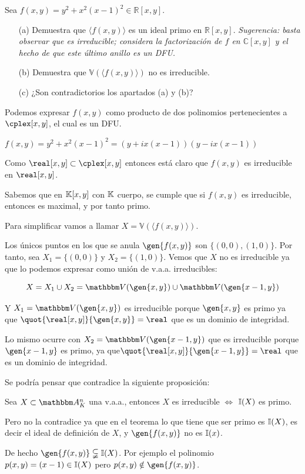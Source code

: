 \begin{problem}
	 Sea  $f(x,y)=y^2+x^2(x-1)^2\in \mathbb{R}[x,y]$. 
	 \begin{enumerate}
	 	\item[(a)] Demuestra que  $\langle f(x,y)\rangle$ es un ideal primo en  ${\mathbb
	 		R}[x,y]$. {\em Sugerencia: basta observar que  es irreducible; considera la factorización de $f$ en ${\mathbb C}[x,y]$ y el hecho de que 
	 		este último anillo es un DFU.}
	 	\item[(b)] Demuestra que ${\mathbb V}(\langle f(x,y)\rangle)$  no es irreducible. 
	 	\item[(c)] ¿Son contradictorios los apartados  (a) y (b)? 
	 \end{enumerate}
	 
	 \solution
	 
	 \spart
	 Podemos expresar $f(x,y)$ como producto de dos polinomios pertenecientes a $\cplex[x,y]$, el cual es un DFU. 
	 
	 $f(x,y)=y^2+x^2(x-1)^2=(y+ix(x-1))(y-ix(x-1))$
	 
	 Como $\real[x,y] \subset \cplex[x,y]$ entonces está claro que $f(x,y)$ es irreducible en $\real[x,y]$.
	 
	 Sabemos que en $\mathbb{K}[x,y]$ con $\mathbb{K}$ cuerpo, se cumple que si $f(x,y)$ es irreducible, entonces es maximal, y por tanto primo.
	 
	 \spart 
	 Para simplificar vamos a llamar $X={\mathbb V}(\langle f(x,y)\rangle)$.
	 
	 Los únicos puntos en los que se anula $\gen{f(x,y)}$ son $\{(0,0),(1,0)\}$. Por tanto, sea $X_1=\{(0,0)\}$ y $X_2=\{(1,0)\}$. Vemos que $X$ no es irreducible ya que lo podemos expresar como unión de v.a.a. irreducibles:
	 
	 $$X=X_1 \cup X_2=\V(\gen{x,y}) \cup \V(\gen{x-1,y})$$
	 
	 Y $X_1=\V(\gen{x,y})$ es irreducible porque $\gen{x,y}$ es primo ya que $\quot{\real[x,y]}{\gen{x,y}}=\real$ que es un dominio de integridad.
	 
	 Lo mismo ocurre con $X_2=\V(\gen{x-1,y})$ que es irreducible porque  $\gen{x-1,y}$ es primo, ya que$\quot{\real[x,y]}{\gen{x-1,y}}=\real$ que es un dominio de integridad.
	 
	 \spart 
	 
	 Se podría pensar que contradice la siguiente proposición:
	 \begin{prop}
	 	Sea $X \subset \A_K^n$ una v.a.a., entonces $X$ es irreducible $\Leftrightarrow$ $\mathbb{I}(X)$ es primo.
	 \end{prop}
	 
	 Pero no la contradice ya que en el teorema lo que tiene que ser primo es $\mathbb{I}(X)$, es decir el ideal de definición de $X$, y $\gen{f(x,y)}$ no es $\mathbb{I}(x)$.  
	 
	 De hecho $\gen{f(x,y)} \subsetneqq \I(X)$. Por ejemplo el polinomio $p(x,y)=(x-1) \in \mathbb{I}(X)$ pero $p(x,y) \notin \gen{f(x,y)}$.
\end{problem}
